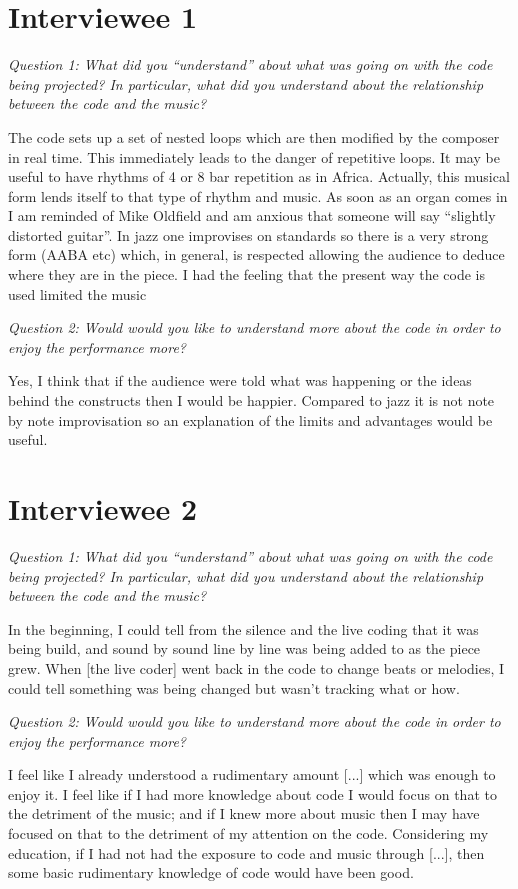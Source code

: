 
\section*{Interviewee 1}
\textit{Question 1: What did you ``understand'' about what was going on with the code being projected? In particular, what did you understand about the relationship between the code and the music?}

The code sets up a set of nested loops which are then modified by the composer in real time. This immediately leads to the danger of repetitive loops. It may be useful to have rhythms of 4 or 8 bar repetition as in Africa. Actually, this musical form lends itself to that type of rhythm and music. As soon as an organ comes in I am reminded of Mike Oldfield and am anxious that someone will say “slightly distorted guitar”. In jazz one improvises on standards so there is a very strong form (AABA etc) which, in general, is respected allowing the audience to deduce where they are in the piece. I had the feeling that the present way the code is used limited the music

\textit{Question 2: Would would you like to understand more about the code in order to enjoy the performance more?}

Yes, I think that if the audience were told what was happening or the ideas behind the constructs then I would be happier. Compared to jazz it is not note by note improvisation so an explanation of the limits and advantages would be useful.

\section*{Interviewee 2}

\textit{Question 1: What did you ``understand'' about what was going on with the code being projected? In particular, what did you understand about the relationship between the code and the music?}

In the beginning, I could tell from the silence and the live coding that it was being build, and sound by sound line by line was being added to as the piece grew.  When [the live coder] went back in the code to change beats or melodies, I could tell something was being changed but wasn't tracking what or how.

\textit{Question 2: Would would you like to understand more about the code in order to enjoy the performance more?}

I feel like I already understood a rudimentary amount [...] which was enough to enjoy it.  I feel like if I had more knowledge about code I would focus on that to the detriment of the music; and if I knew more about music then I may have focused on that to the detriment of my attention on the code.  Considering my education, if I had not had the exposure to code and music through [...], then some basic rudimentary knowledge of code would have been good.

